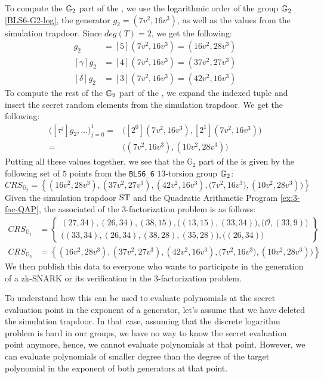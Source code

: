 \begin{example}
To compute the $\mathbb{G}_2$ part of the , we use the logarithmic order of the group $\mathbb{G}_2$ \ref{BLS6-G2-log}, the generator $g_2=(7v^2,16v^3)$, as well as the values from the simulation trapdoor. Since $deg(T)=2$, we get the following:
\begin{align*}
[\beta]g_2 & = [5](7v^2,16v^3) = (16v^2,28v^3) \\
[\gamma]g_2 & = [4](7v^2,16v^3) = (37v^2,27v^3) \\
[\delta]g_2 & = [3](7v^2,16v^3) = (42v^2,16v^3)
\end{align*}
To compute the rest of the $\mathbb{G}_2$ part of the , we expand the indexed tuple and insert the secret random elements from the simulation trapdoor. We get the following:
\begin{align*}
\Big( [\tau^{j}]g_2,\ldots\Big) _{j=0}^{1} = 
 & \Big( [2^0](7v^2,16v^3), [2^1](7v^2,16v^3)\Big)  \\
 = & \Big((7v^2,16v^3),(10v^2,28v^3)\Big)
\end{align*}
Putting all these values together, we see that the $\mathbb{G}_2$ part of the  is given by the following set of $5$ points from the \texttt{BLS6\_6} $13$-torsion group $\mathbb{G}_2$:
$$
CRS_{\mathbb{G}_{2}}=\left\{(16v^2,28v^3) ,(37v^2,27v^3),(42v^2,16v^3),\Big(7v^2,16v^3), (10v^2,28v^3)\Big)\right\} 
$$
Given the simulation trapdoor $\mathrm{ST}$ and the Quadratic Arithmetic Program \ref{ex:3-fac-QAP}, the associated  of the $3$-factorization problem is as follows:
\begin{align*}
CRS_{\mathbb{G}_{1}} &=\left\{ \begin{array}{c}
(27,34),(26,34),(38,15),\Big((13,15),(33,34)\Big),
\Big(\mathcal{O}, (33,9)\Big)\\
\Big((33,34),(26,34),(38,28),(35,28)\Big),
\Big((26,34)\Big)
\end{array}\right\}\\
CRS_{\mathbb{G}_{2}} &=\left\{(16v^2,28v^3) ,(37v^2,27v^3),(42v^2,16v^3),\Big(7v^2,16v^3), (10v^2,28v^3)\Big)\right\}
\end{align*}
We then publish this data to everyone who wants to participate in the generation of a zk-SNARK or its verification in the $3$-factorization problem.

To understand how this  can be used to evaluate polynomials at the secret evaluation point in the exponent of a generator, let's assume that we have deleted the simulation trapdoor. In that case, assuming that the discrete logarithm problem is hard in our groups, we have no way to know the secret evaluation point anymore, hence, we cannot evaluate polynomials at that point. However, we can evaluate polynomials of smaller degree than the degree of the target polynomial in the exponent of both generators at that point. 


\end{example}
